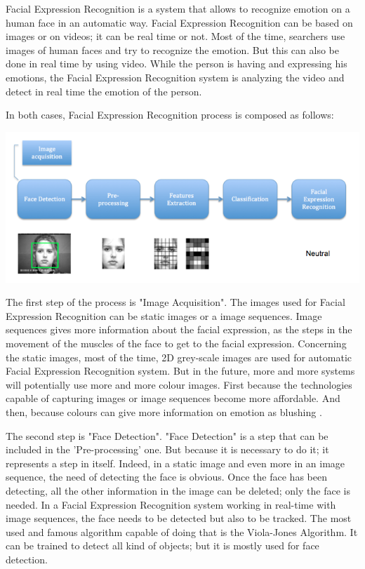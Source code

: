 \noindent Facial Expression Recognition is a system that allows to recognize emotion on a human face in an automatic way. Facial Expression Recognition can be based on images or on videos; it can be real time or not. Most of the time, searchers use images of human faces and try to recognize the emotion. But this can also be done in real time by using video. While the person is having and expressing his emotions, the Facial Expression Recognition system is analyzing the video and detect in real time the emotion of the person.
\newline

\noindent In both cases, Facial Expression Recognition process is composed as follows:


\noindent \includegraphics[scale=0.6]{figures/facial_expression_recognition_process}

\noindent The first step of the process is "Image Acquisition". The images used for Facial Expression Recognition can be static images or a image sequences. Image sequences gives more information about the facial expression, as the steps in the movement of the muscles of the face to get to the facial expression. Concerning the static images, most of the time, 2D grey-scale images are used for automatic Facial Expression Recognition system. But in the future, more and more systems will potentially use more and more colour images. First because the technologies capable of capturing images or image sequences become more affordable. And then, because colours can give more information on emotion as blushing \cite{CHI03}.
\newline

\noindent The second step is "Face Detection". "Face Detection" is a step that can be included in the 'Pre-processing' one. But because it is necessary to do it; it represents a step in itself. Indeed, in a static image and even more in an image sequence, the need of detecting the face is obvious. Once the face has been detecting, all the other information in the image can be deleted; only the face is needed. In a Facial Expression Recognition system working in real-time with image sequences, the face needs to be detected but also to be tracked. The most used and famous algorithm capable of doing that is the Viola-Jones Algorithm. It can be trained to detect all kind of objects; but it is mostly used for face detection.
\newline

